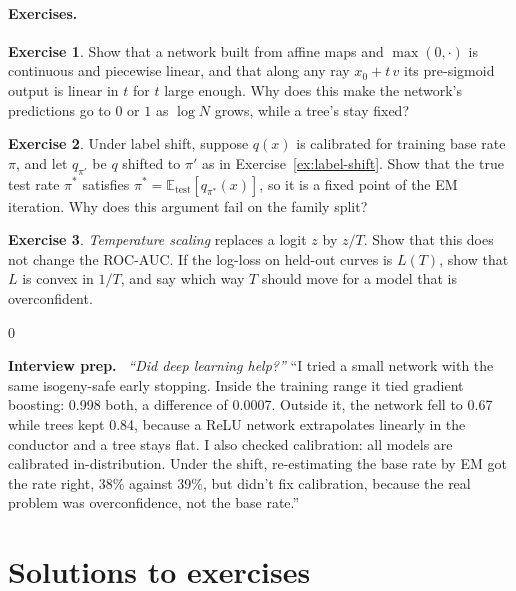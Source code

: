 \documentclass[11pt]{article}
\theoremstyle{definition}
\newtheorem{exercise}{Exercise}[section]
\theoremstyle{plain}
\theoremstyle{remark}
\newcommand{\E}{\mathbb{E}}
\renewcommand{\_}{\oldunderscore\allowbreak}
\newenvironment{interview}
  {\par\medskip\noindent\begin{lrbox}{0}\begin{minipage}{\dimexpr\linewidth-2\fboxsep-2\fboxrule\relax}
   \textbf{Interview prep.}\ }
  {\end{minipage}\end{lrbox}\fcolorbox{blue!40!black}{interviewbg}{\usebox{0}}\par\medskip}
\begin{document}
\paragraph{Exercises.}
\begin{exercise}\label{ex:relu}
Show that a network built from affine maps and $\max(0,\cdot)$ is continuous and piecewise
linear, and that along any ray $x_0+t\,v$ its pre-sigmoid output is linear in $t$ for $t$ large
enough. Why does this make the network's predictions go to $0$ or $1$ as $\log N$ grows, while a
tree's stay fixed?
\end{exercise}
\begin{exercise}\label{ex:em}
Under label shift, suppose $q(x)$ is calibrated for training base rate $\pi$, and let $q_{\pi'}$
be $q$ shifted to $\pi'$ as in Exercise~\ref{ex:label-shift}. Show that the true test rate
$\pi^*$ satisfies $\pi^*=\E_{\text{test}}[q_{\pi^*}(x)]$, so it is a fixed point of the EM
iteration. Why does this argument fail on the family split?
\end{exercise}
\begin{exercise}\label{ex:temperature}
\emph{Temperature scaling} replaces a logit $z$ by $z/T$. Show that this does not change the
ROC-AUC. If the log-loss on held-out curves is $L(T)$, show that $L$ is convex in $1/T$, and say
which way $T$ should move for a model that is overconfident.
\end{exercise}

\begin{interview}
\emph{``Did deep learning help?''} ``I tried a small network with the same isogeny-safe early
stopping. Inside the training range it tied gradient boosting: 0.998 both, a difference of
0.0007. Outside it, the network fell to 0.67 while trees kept 0.84, because a ReLU network
extrapolates linearly in the conductor and a tree stays flat. I also checked calibration: all
models are calibrated in-distribution. Under the shift, re-estimating the base rate by EM got
the rate right, 38\% against 39\%, but didn't fix calibration, because the real problem was
overconfidence, not the base rate.''
\end{interview}

\appendix
\section*{Solutions to exercises}
\end{document}
